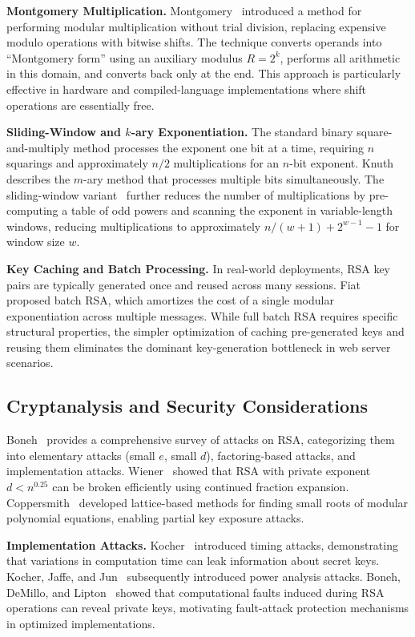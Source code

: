 \documentclass[journal]{IEEEtran}
\begin{document}
\textbf{Montgomery Multiplication.}
Montgomery~\cite{montgomery1985} introduced a method for performing modular multiplication without trial division, replacing expensive modulo operations with bitwise shifts. The technique converts operands into ``Montgomery form'' using an auxiliary modulus $R = 2^k$, performs all arithmetic in this domain, and converts back only at the end. This approach is particularly effective in hardware and compiled-language implementations where shift operations are essentially free.

\textbf{Sliding-Window and $k$-ary Exponentiation.}
The standard binary square-and-multiply method processes the exponent one bit at a time, requiring $n$ squarings and approximately $n/2$ multiplications for an $n$-bit exponent. Knuth~\cite{knuth1997} describes the $m$-ary method that processes multiple bits simultaneously. The sliding-window variant~\cite{menezes2001} further reduces the number of multiplications by pre-computing a table of odd powers and scanning the exponent in variable-length windows, reducing multiplications to approximately $n/(w+1) + 2^{w-1} - 1$ for window size $w$.

\textbf{Key Caching and Batch Processing.}
In real-world deployments, RSA key pairs are typically generated once and reused across many sessions. Fiat~\cite{fiat1997} proposed batch RSA, which amortizes the cost of a single modular exponentiation across multiple messages. While full batch RSA requires specific structural properties, the simpler optimization of caching pre-generated keys and reusing them eliminates the dominant key-generation bottleneck in web server scenarios.

\subsection{Cryptanalysis and Security Considerations}

Boneh~\cite{boneh1999} provides a comprehensive survey of attacks on RSA, categorizing them into elementary attacks (small $e$, small $d$), factoring-based attacks, and implementation attacks. Wiener~\cite{wiener1990} showed that RSA with private exponent $d < n^{0.25}$ can be broken efficiently using continued fraction expansion. Coppersmith~\cite{coppersmith1997} developed lattice-based methods for finding small roots of modular polynomial equations, enabling partial key exposure attacks.

\textbf{Implementation Attacks.}
Kocher~\cite{kocher1996} introduced timing attacks, demonstrating that variations in computation time can leak information about secret keys. Kocher, Jaffe, and Jun~\cite{kocher1999} subsequently introduced power analysis attacks. Boneh, DeMillo, and Lipton~\cite{boneh2001} showed that computational faults induced during RSA operations can reveal private keys, motivating fault-attack protection mechanisms in optimized implementations.
\end{document}
